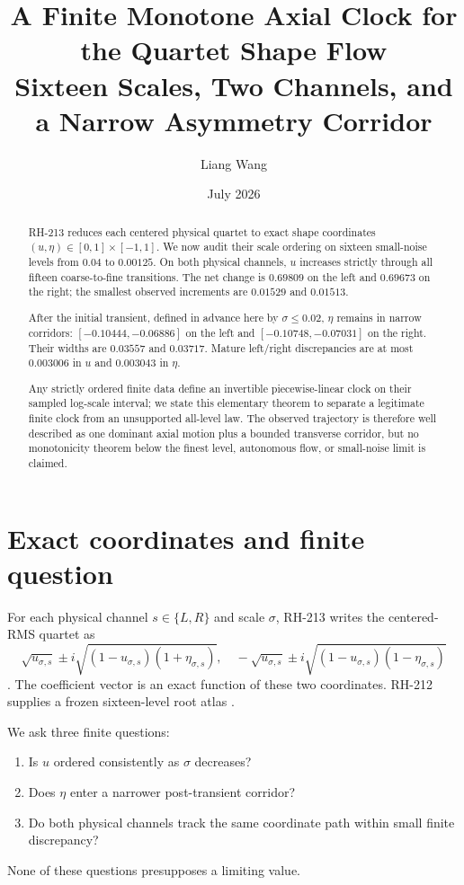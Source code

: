 \documentclass[12pt]{article}
\title{A Finite Monotone Axial Clock for the Quartet Shape Flow\\
\large Sixteen Scales, Two Channels, and a Narrow Asymmetry Corridor}
\author{Liang Wang}\date{July 2026}
\theoremstyle{remark}\newtheorem{remark}[theorem]{Remark}
\begin{document}
\maketitle
\begin{abstract}
RH-213 reduces each centered physical quartet to exact shape coordinates
$(u,\eta)\in[0,1]\times[-1,1]$.  We now audit their scale ordering on sixteen
small-noise levels from $0.04$ to $0.00125$.  On both physical channels, $u$
increases strictly through all fifteen coarse-to-fine transitions.  The net
change is $0.69809$ on the left and $0.69673$ on the right; the smallest
observed increments are $0.01529$ and $0.01513$.

After the initial transient, defined in advance here by $\sigma\le0.02$,
$\eta$ remains in narrow corridors: $[-0.10444,-0.06886]$ on the left and
$[-0.10748,-0.07031]$ on the right.  Their widths are $0.03557$ and
$0.03717$.  Mature left/right discrepancies are at most $0.003006$ in $u$
and $0.003043$ in $\eta$.

Any strictly ordered finite data define an invertible piecewise-linear clock
on their sampled log-scale interval; we state this elementary theorem to
separate a legitimate finite clock from an unsupported all-level law.  The
observed trajectory is therefore well described as one dominant axial motion
plus a bounded transverse corridor, but no monotonicity theorem below the
finest level, autonomous flow, or small-noise limit is claimed.
\end{abstract}

\section{Exact coordinates and finite question}

For each physical channel $s\in\{L,R\}$ and scale $\sigma$, RH-213 writes
the centered-RMS quartet as
\begin{equation}\label{eq:roots}
 \sqrt{u_{\sigma,s}}\pm i\sqrt{(1-u_{\sigma,s})(1+\eta_{\sigma,s})},
 \quad
 -\sqrt{u_{\sigma,s}}\pm i\sqrt{(1-u_{\sigma,s})(1-\eta_{\sigma,s})}
\end{equation}
\citep{WangRH213}.  The coefficient vector is an exact function of these two
coordinates.  RH-212 supplies a frozen sixteen-level root atlas
\citep{WangRH212}.

We ask three finite questions:
\begin{enumerate}[leftmargin=2em]
\item Is $u$ ordered consistently as $\sigma$ decreases?
\item Does $\eta$ enter a narrower post-transient corridor?
\item Do both physical channels track the same coordinate path within small
finite discrepancy?
\end{enumerate}
None of these questions presupposes a limiting value.
\end{document}
